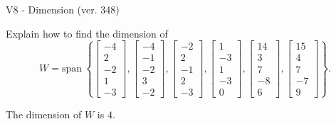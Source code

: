 \begin{exercise}
  \begin{exerciseTitle}V8 - Dimension (ver. 348)\end{exerciseTitle}
  \begin{exerciseStatement}
    Explain how to find the dimension of 
\[W=\mathrm{span}\ \left\{\left[\begin{array}{r}
-4 \\
2 \\
-2 \\
1 \\
-3
\end{array}\right] , \left[\begin{array}{r}
-4 \\
-1 \\
-2 \\
3 \\
-2
\end{array}\right] , \left[\begin{array}{r}
-2 \\
2 \\
-1 \\
2 \\
-3
\end{array}\right] , \left[\begin{array}{r}
1 \\
-3 \\
1 \\
-3 \\
0
\end{array}\right] , \left[\begin{array}{r}
14 \\
3 \\
7 \\
-8 \\
6
\end{array}\right] , \left[\begin{array}{r}
15 \\
4 \\
7 \\
-7 \\
9
\end{array}\right]\right\}.\]



  \end{exerciseStatement}
  \begin{exerciseAnswer}
   The dimension of \(W\) is  \(4\).
  


  \end{exerciseAnswer}
\end{exercise}